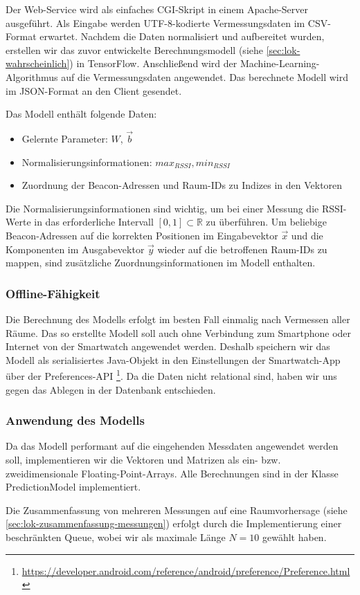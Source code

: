 Der Web-Service wird als einfaches CGI-Skript in einem Apache-Server ausgeführt.
Als Eingabe werden UTF-8-kodierte Vermessungsdaten im CSV-Format erwartet.
Nachdem die Daten normalisiert und aufbereitet wurden, erstellen wir das
zuvor entwickelte Berechnungsmodell (siehe \ref{sec:lok-wahrscheinlich}) in
TensorFlow. Anschließend wird der Machine-Learning-Algorithmus auf die
Vermessungsdaten angewendet.
Das berechnete Modell wird im JSON-Format an den Client gesendet.

Das Modell enthält folgende Daten:
\begin{itemize}
	\item Gelernte Parameter: $W$, $\vec{b}$
	\item Normalisierungsinformationen: $max_{RSSI}, min_{RSSI}$
	\item Zuordnung der Beacon-Adressen und Raum-IDs zu Indizes in den Vektoren
\end{itemize}
Die Normalisierungsinformationen sind wichtig, um bei einer Messung die RSSI-Werte in
das erforderliche Intervall $[0, 1] \subset \mathbb{R}$ zu überführen.
Um beliebige Beacon-Adressen auf die korrekten Positionen im Eingabevektor $\vec{x}$
und die Komponenten im Ausgabevektor $\vec{y}$ wieder auf die betroffenen Raum-IDs
zu mappen, sind zusätzliche Zuordnungsinformationen im Modell enthalten.

\subsubsection{Offline-Fähigkeit}

Die Berechnung des Modells erfolgt im besten Fall einmalig nach Vermessen aller Räume.
Das so erstellte Modell soll auch ohne Verbindung zum Smartphone oder Internet von
der Smartwatch angewendet werden. Deshalb speichern wir das Modell als serialisiertes
Java-Objekt in den Einstellungen der Smartwatch-App über der Preferences-API
\footnote{\url{https://developer.android.com/reference/android/preference/Preference.html}}.
Da die Daten nicht relational sind, haben wir uns gegen das Ablegen in der Datenbank
entschieden.

\subsubsection{Anwendung des Modells}

Da das Modell performant auf die eingehenden Messdaten angewendet werden soll,
implementieren wir die Vektoren und Matrizen als ein- bzw. zweidimensionale
Floating-Point-Arrays. Alle Berechnungen sind in der Klasse PredictionModel
implementiert.

Die Zusammenfassung von mehreren Messungen auf eine Raumvorhersage
(siehe \ref{sec:lok-zusammenfassung-messungen}) erfolgt durch die Implementierung
einer beschränkten Queue, wobei wir als maximale Länge $N = 10$ gewählt haben.


